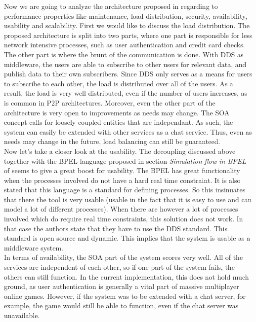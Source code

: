 Now we are going to analyze the architecture proposed in \cite{service} regarding to performance properties like maintenance, load distribution, security, availability, usability and scalability. 
First we would like to discuss the load distribution.
The proposed architecture is split into two parts, where one part is responsible for less network intensive processes, such as user authentication and credit card checks. 
The other part is where the brunt of the communication is done.
With DDS as middleware, the users are able to subscribe to other users for relevant data, and publish data to their own subscribers.
Since DDS only serves as a means for users to subscribe to each other, the load is distributed over all of the users.
As a result, the load is very well distributed, even if the number of users increases, as is common in P2P architectures. 
Moreover, even the other part of the architecture is very open to improvements as needs may change.
The SOA concept calls for loosely coupled entities that are independant.
As such, the system can easily be extended with other services as a chat service.
Thus, even as needs may change in the future, load balancing can still be guaranteed. \\
Now let’s take a closer look at the usability. 
The decoupling discussed above together with the BPEL language proposed in section \emph{Simulation flow in BPEL} of \cite{service} seems to give a great boost for usability. 
The BPEL has great functionality when the processes involved do not have a hard real time constraint. 
It is also stated that this language is a standard for defining processes. 
So this insinuates that there the tool is very usable (usable in the fact that it is easy to use and can model a lot of different processes). 
When there are however a lot of processes involved which do require real time constraints, this solution does not work. 
In that case the authors state that they have to use the DDS standard. 
This standard is open source and dynamic. 
This implies that the system is usable as a middleware system. \\
In terms of availability, the SOA part of the system scores very well.
All of the services are independent of each other, so if one part of the system fails, the others can still function.
In the current implementation, this does not hold much ground, as user authentication is generally a vital part of massive multiplayer online games.
However, if the system was to be extended with a chat server, for example, the game would still be able to function, even if the chat server was unavailable.
